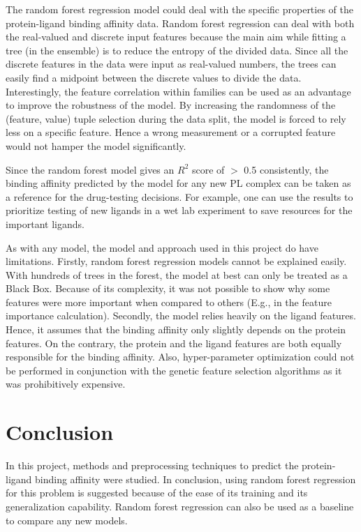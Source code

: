 \documentclass[11pt]{article}
\begin{document}
The random forest regression model could deal with the specific properties of the protein-ligand binding affinity data.
Random forest regression can deal with both the real-valued and discrete input features because the main aim while fitting a tree (in the ensemble) is to reduce the entropy of the divided data.
Since all the discrete features in the data were input as real-valued numbers,  the trees can easily find a midpoint between the discrete values to divide the data. 
Interestingly, the feature correlation within families can be used as an advantage to improve the robustness of the model. 
By increasing the randomness of the (feature, value) tuple selection during the data split, the model is forced to rely less on a specific feature.
Hence a wrong measurement or a corrupted feature would not hamper the model significantly.

Since the random forest model gives an $R^2$ score of $>$ 0.5 consistently,  the binding affinity predicted by the model for any new PL complex can be taken as a reference for the drug-testing decisions.
For example,  one can use the results to prioritize testing of new ligands in a wet lab experiment to save resources for the important ligands.

As with any model,  the model and approach used in this project do have limitations. 
Firstly, random forest regression models cannot be explained easily.
With hundreds of trees in the forest, the model at best can only be treated as a Black Box.
Because of its complexity,  it was not possible to show why some features were more important when compared to others (E.g., in the feature importance calculation).
Secondly, the model relies heavily on the ligand features. 
Hence, it assumes that the binding affinity only slightly depends on the protein features. On the contrary, the protein and the ligand features are both equally responsible for the binding affinity.
Also,  hyper-parameter optimization could not be performed
in conjunction with the genetic feature selection algorithms as it was prohibitively expensive.

\section{Conclusion}
In this project, methods and preprocessing techniques to predict the protein-ligand binding affinity were studied.
In conclusion, using random forest regression for this problem is suggested because of the ease of its training and its generalization capability.
Random forest regression can also be used as a baseline to compare any new models.
\end{document}
